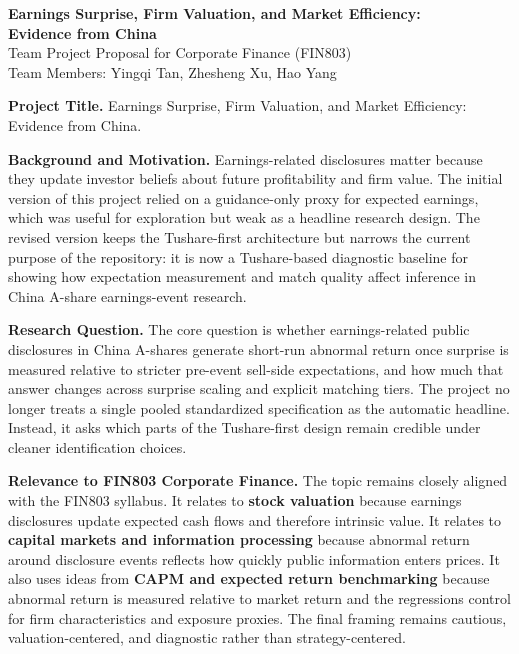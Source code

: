 \documentclass[11pt]{article}
\begin{document}
\begin{center}
    {\Large \textbf{Earnings Surprise, Firm Valuation, and Market Efficiency:}\\[-0.15em]
    \textbf{Evidence from China}}\\[0.2em]
    {\small Team Project Proposal for Corporate Finance (FIN803)}\\[0.1em]
    {\footnotesize Team Members: Yingqi Tan, Zhesheng Xu, Hao Yang}
\end{center}

\small

\noindent\textbf{Project Title.} Earnings Surprise, Firm Valuation, and Market Efficiency: Evidence from China.

\noindent\textbf{Background and Motivation.} Earnings-related disclosures matter because they update investor beliefs about future profitability and firm value. The initial version of this project relied on a guidance-only proxy for expected earnings, which was useful for exploration but weak as a headline research design. The revised version keeps the Tushare-first architecture but narrows the current purpose of the repository: it is now a Tushare-based diagnostic baseline for showing how expectation measurement and match quality affect inference in China A-share earnings-event research.

\noindent\textbf{Research Question.} The core question is whether earnings-related public disclosures in China A-shares generate short-run abnormal return once surprise is measured relative to stricter pre-event sell-side expectations, and how much that answer changes across surprise scaling and explicit matching tiers. The project no longer treats a single pooled standardized specification as the automatic headline. Instead, it asks which parts of the Tushare-first design remain credible under cleaner identification choices.

\noindent\textbf{Relevance to FIN803 Corporate Finance.} The topic remains closely aligned with the FIN803 syllabus. It relates to \textbf{stock valuation} because earnings disclosures update expected cash flows and therefore intrinsic value. It relates to \textbf{capital markets and information processing} because abnormal return around disclosure events reflects how quickly public information enters prices. It also uses ideas from \textbf{CAPM and expected return benchmarking} because abnormal return is measured relative to market return and the regressions control for firm characteristics and exposure proxies. The final framing remains cautious, valuation-centered, and diagnostic rather than strategy-centered.
\end{document}
